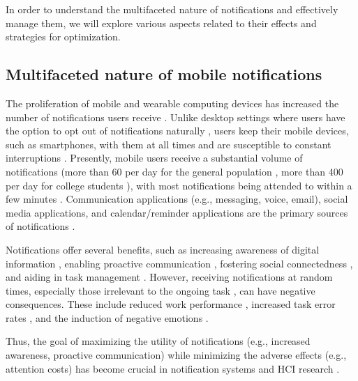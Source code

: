 In order to understand the multifaceted nature of notifications and effectively manage them, we will explore various aspects related to their effects and strategies for optimization.

\subsection{Multifaceted nature of mobile notifications}
\label{sec:Relatedwork:notification_usage}

The proliferation of mobile and wearable computing devices has increased the number of notifications users receive \cite{chuang_ambient_2017, noauthor_push_2019, statista_us_2021}. Unlike desktop settings where users have the option to opt out of notifications naturally \cite{pielot_didnt_2014}, users keep their mobile devices, such as smartphones, with them at all times and are susceptible to constant interruptions \cite{dey_getting_2011, hakoama2011impact}. Presently, mobile users receive a substantial volume of notifications (more than 60 per day for the general population \cite{sahami_shirazi_large_scale_2014, pielot_dismissed_2018}, more than 400 per day for college students \cite{lee_hooked_2014}), with most notifications being attended to within a few minutes \cite{pielot_situ_2014, sahami_shirazi_large_scale_2014}. Communication applications (e.g., messaging, voice, email), social media applications, and calendar/reminder applications are the primary sources of notifications \cite{sahami_shirazi_large_scale_2014, pielot_situ_2014}.

Notifications offer several benefits, such as increasing awareness of digital information \cite{iqbal_notifications_2010, horvitz_balancing_2005}, enabling proactive communication \cite{pielot_situ_2014}, fostering social connectedness \cite{pielot_situ_2014}, and aiding in task management \cite{paul_interruptive_2015}. However, receiving notifications at random times, especially those irrelevant to the ongoing task \cite{mehrotra_designing_2015}, can have negative consequences. These include reduced work performance \cite{stothart_attentional_2015, bailey_effects_2001, cutrell_notification_2001}, increased task error rates \cite{adamczyk_if_2004}, and the induction of negative emotions \cite{bailey_effects_2001, adamczyk_if_2004, kushlev_silence_2016, pielot_situ_2014}.


Thus, the goal of maximizing the utility of notifications (e.g., increased awareness, proactive communication) while minimizing the adverse effects (e.g., attention costs) has become crucial in notification systems and HCI research \cite{mccrickard_attuning_2003, mccrickard_model_2003}.


